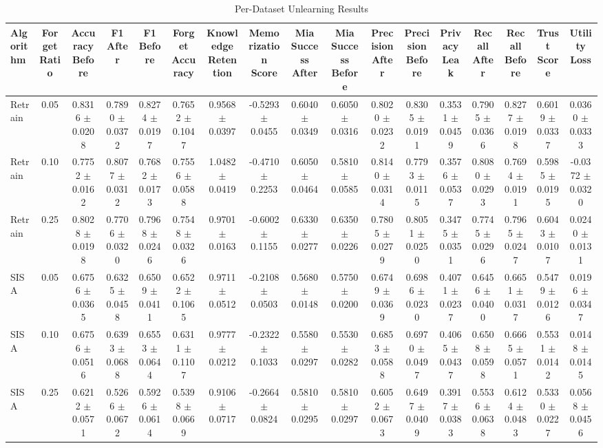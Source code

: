 \begin{table}[t]
\centering
\caption{Per-Dataset Unlearning Results}
\label{tab:per_dataset}
\small
\vspace{2mm}
\begin{tabular}{lcccccccccccccccc}
\toprule
Algorithm & Forget Ratio & Accuracy Before & F1 After & F1 Before & Forget Accuracy & Knowledge Retention & Memorization Score & Mia Success After & Mia Success Before & Precision After & Precision Before & Privacy Leak & Recall After & Recall Before & Trust Score & Utility Loss \\
\midrule
Retrain & 0.05 & 0.8316 $\pm$ 0.0208 & 0.7890 $\pm$ 0.0372 & 0.8274 $\pm$ 0.0197 & 0.7652 $\pm$ 0.1047 & 0.9568 $\pm$ 0.0397 & -0.5293 $\pm$ 0.0455 & 0.6040 $\pm$ 0.0349 & 0.6050 $\pm$ 0.0316 & 0.8020 $\pm$ 0.0232 & 0.8305 $\pm$ 0.0191 & 0.3531 $\pm$ 0.0459 & 0.7905 $\pm$ 0.0366 & 0.8277 $\pm$ 0.0198 & 0.6019 $\pm$ 0.0337 & 0.0360 $\pm$ 0.0333 \\
Retrain & 0.10 & 0.7752 $\pm$ 0.0162 & 0.8077 $\pm$ 0.0312 & 0.7682 $\pm$ 0.0173 & 0.7556 $\pm$ 0.0588 & 1.0482 $\pm$ 0.0419 & -0.4710 $\pm$ 0.2253 & 0.6050 $\pm$ 0.0464 & 0.5810 $\pm$ 0.0585 & 0.8140 $\pm$ 0.0314 & 0.7793 $\pm$ 0.0115 & 0.3576 $\pm$ 0.0537 & 0.8080 $\pm$ 0.0293 & 0.7694 $\pm$ 0.0191 & 0.5985 $\pm$ 0.0195 & -0.0372 $\pm$ 0.0320 \\
Retrain & 0.25 & 0.8028 $\pm$ 0.0198 & 0.7706 $\pm$ 0.0320 & 0.7968 $\pm$ 0.0246 & 0.7548 $\pm$ 0.0326 & 0.9701 $\pm$ 0.0163 & -0.6002 $\pm$ 0.1155 & 0.6330 $\pm$ 0.0277 & 0.6350 $\pm$ 0.0226 & 0.7805 $\pm$ 0.0279 & 0.8051 $\pm$ 0.0250 & 0.3475 $\pm$ 0.0351 & 0.7745 $\pm$ 0.0296 & 0.7965 $\pm$ 0.0247 & 0.6043 $\pm$ 0.0107 & 0.0240 $\pm$ 0.0131 \\
SISA & 0.05 & 0.6756 $\pm$ 0.0365 & 0.6325 $\pm$ 0.0458 & 0.6509 $\pm$ 0.0411 & 0.6522 $\pm$ 0.1065 & 0.9711 $\pm$ 0.0512 & -0.2108 $\pm$ 0.0503 & 0.5680 $\pm$ 0.0148 & 0.5750 $\pm$ 0.0200 & 0.6749 $\pm$ 0.0369 & 0.6986 $\pm$ 0.0230 & 0.4071 $\pm$ 0.0237 & 0.6456 $\pm$ 0.0400 & 0.6651 $\pm$ 0.0317 & 0.5479 $\pm$ 0.0126 & 0.0196 $\pm$ 0.0347 \\
SISA & 0.10 & 0.6756 $\pm$ 0.0516 & 0.6393 $\pm$ 0.0688 & 0.6553 $\pm$ 0.0644 & 0.6311 $\pm$ 0.1107 & 0.9777 $\pm$ 0.0212 & -0.2322 $\pm$ 0.1033 & 0.5580 $\pm$ 0.0297 & 0.5530 $\pm$ 0.0282 & 0.6853 $\pm$ 0.0588 & 0.6970 $\pm$ 0.0497 & 0.4065 $\pm$ 0.0437 & 0.6508 $\pm$ 0.0598 & 0.6665 $\pm$ 0.0571 & 0.5531 $\pm$ 0.0142 & 0.0148 $\pm$ 0.0145 \\
SISA & 0.25 & 0.6212 $\pm$ 0.0571 & 0.5266 $\pm$ 0.0672 & 0.5926 $\pm$ 0.0614 & 0.5398 $\pm$ 0.0669 & 0.9106 $\pm$ 0.0717 & -0.2664 $\pm$ 0.0824 & 0.5810 $\pm$ 0.0295 & 0.5810 $\pm$ 0.0297 & 0.6052 $\pm$ 0.0673 & 0.6497 $\pm$ 0.0409 & 0.3917 $\pm$ 0.0383 & 0.5536 $\pm$ 0.0638 & 0.6124 $\pm$ 0.0483 & 0.5330 $\pm$ 0.0227 & 0.0568 $\pm$ 0.0456 \\

\end{tabular}
\end{table}
